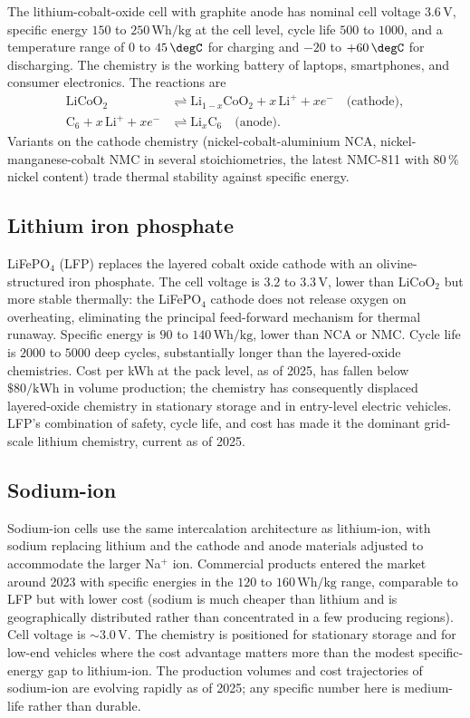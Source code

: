 The lithium-cobalt-oxide cell with graphite anode has nominal cell
voltage $3.6\,\text{V}$, specific energy $150$ to $250\,\text{Wh}/
\text{kg}$ at the cell level, cycle life $500$ to $1000$, and a
temperature range of $0$ to $45\,\degC$ for charging and $-20$ to
$+60\,\degC$ for discharging. The chemistry is the working battery of
laptops, smartphones, and consumer electronics. The reactions are
\begin{align*}
\text{LiCoO}_2 &\rightleftharpoons \text{Li}_{1-x}\text{CoO}_2 + x\,
\text{Li}^+ + x e^- \quad \text{(cathode)}, \\
\text{C}_6 + x\,\text{Li}^+ + x e^- &\rightleftharpoons \text{Li}_x\text{C}_6
\quad \text{(anode)}.
\end{align*}
Variants on the cathode chemistry (nickel-cobalt-aluminium NCA,
nickel-manganese-cobalt NMC in several stoichiometries, the latest
NMC-811 with $80\,\%$ nickel content) trade thermal stability against
specific energy.

\subsection{Lithium iron phosphate}

LiFePO$_4$ (LFP) replaces the layered cobalt oxide cathode with an
olivine-structured iron phosphate. The cell voltage is $3.2$ to
$3.3\,\text{V}$, lower than LiCoO$_2$ but more stable thermally: the
LiFePO$_4$ cathode does not release oxygen on overheating, eliminating
the principal feed-forward mechanism for thermal runaway. Specific
energy is $90$ to $140\,\text{Wh}/\text{kg}$, lower than NCA or NMC.
Cycle life is $2000$ to $5000$ deep cycles, substantially longer than
the layered-oxide chemistries. Cost per kWh at the pack level, as of
2025, has fallen below $\$80/\text{kWh}$ in volume production; the
chemistry has consequently displaced layered-oxide chemistry in
stationary storage and in entry-level electric vehicles. LFP's
combination of safety, cycle life, and cost has made it the dominant
grid-scale lithium chemistry, current as of 2025.

\subsection{Sodium-ion}

Sodium-ion cells use the same intercalation architecture as
lithium-ion, with sodium replacing lithium and the cathode and anode
materials adjusted to accommodate the larger Na$^+$ ion. Commercial
products entered the market around 2023 with specific energies in the
$120$ to $160\,\text{Wh}/\text{kg}$ range, comparable to LFP but with
lower cost (sodium is much cheaper than lithium and is geographically
distributed rather than concentrated in a few producing regions).
Cell voltage is $\sim 3.0\,\text{V}$. The chemistry is positioned for
stationary storage and for low-end vehicles where the cost advantage
matters more than the modest specific-energy gap to lithium-ion. The
production volumes and cost trajectories of sodium-ion are evolving
rapidly as of 2025; any specific number here is medium-life rather
than durable.

